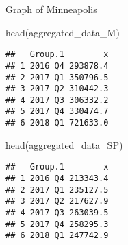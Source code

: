 \documentclass[
]{article}
\newenvironment{Shaded}{\begin{snugshade}}{\end{snugshade}}
\newcommand{\AttributeTok}[1]{\textcolor[rgb]{0.77,0.63,0.00}{#1}}
\newcommand{\FunctionTok}[1]{\textcolor[rgb]{0.00,0.00,0.00}{#1}}
\newcommand{\NormalTok}[1]{#1}
\newcommand{\OtherTok}[1]{\textcolor[rgb]{0.56,0.35,0.01}{#1}}
\newcommand{\SpecialCharTok}[1]{\textcolor[rgb]{0.00,0.00,0.00}{#1}}
\begin{document}
\begin{Shaded}
\end{Shaded}

Graph of Minneapolis

\begin{Shaded}
\begin{Highlighting}[]
\FunctionTok{head}\NormalTok{(aggregated\_data\_M)}
\end{Highlighting}
\end{Shaded}

\begin{verbatim}
##   Group.1        x
## 1 2016 Q4 293878.4
## 2 2017 Q1 350796.5
## 3 2017 Q2 310442.3
## 4 2017 Q3 306332.2
## 5 2017 Q4 330474.7
## 6 2018 Q1 721633.0
\end{verbatim}

\begin{Shaded}
\begin{Highlighting}[]
\FunctionTok{head}\NormalTok{(aggregated\_data\_SP)}
\end{Highlighting}
\end{Shaded}

\begin{verbatim}
##   Group.1        x
## 1 2016 Q4 213343.4
## 2 2017 Q1 235127.5
## 3 2017 Q2 217627.9
## 4 2017 Q3 263039.5
## 5 2017 Q4 258295.3
## 6 2018 Q1 247742.9
\end{verbatim}
\end{document}
